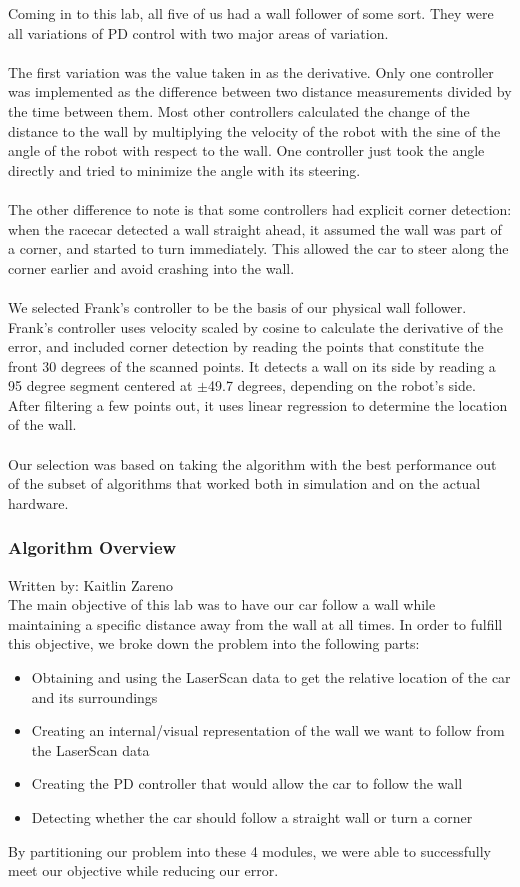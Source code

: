 \documentclass{article}
\begin{document}
Coming in to this lab, all five of us had a wall follower of some sort. They were all variations of PD control with two major areas of variation.\\\\
The first variation was the value taken in as the derivative. Only one controller was implemented as the difference between two distance measurements divided by the time between them. Most other controllers calculated the change of the distance to the wall by multiplying the velocity of the robot with the sine of the angle of the robot with respect to the wall. One controller just took the angle directly and tried to minimize the angle with its steering.\\\\
The other difference to note is that some controllers had explicit corner detection: when the racecar detected a wall straight ahead, it assumed the wall was part of a corner, and started to turn immediately. This allowed the car to steer along the corner earlier and avoid crashing into the wall.\\\\
We selected Frank's controller to be the basis of our physical wall follower. Frank's controller uses velocity scaled by cosine to calculate the derivative of the error, and included corner detection by reading the points that constitute the front 30 degrees of the scanned points. It detects a wall on its side by reading a 95 degree segment centered at $\pm$49.7 degrees, depending on the robot's side. After filtering a few points out, it uses linear regression to determine the location of the wall.\\\\
Our selection was based on taking the algorithm with the best performance out of the subset of algorithms that worked both in simulation and on the actual hardware.

\subsubsection{Algorithm Overview}
Written by: Kaitlin Zareno\\

The main objective of this lab was to have our car follow a wall while maintaining a specific distance away from the wall at all times. In order to fulfill this objective, we broke down the problem into the following parts:
\begin{itemize}
  \item Obtaining and using the LaserScan data to get the relative location of the car and its surroundings
  \item Creating an internal/visual representation of the wall we want to follow from the LaserScan data
  \item Creating the PD controller that would allow the car to follow the wall
  \item Detecting whether the car should follow a straight wall or turn a corner
\end{itemize}
By partitioning our problem into these 4 modules, we were able to successfully meet our objective while reducing our error. \\ 
\end{document}
